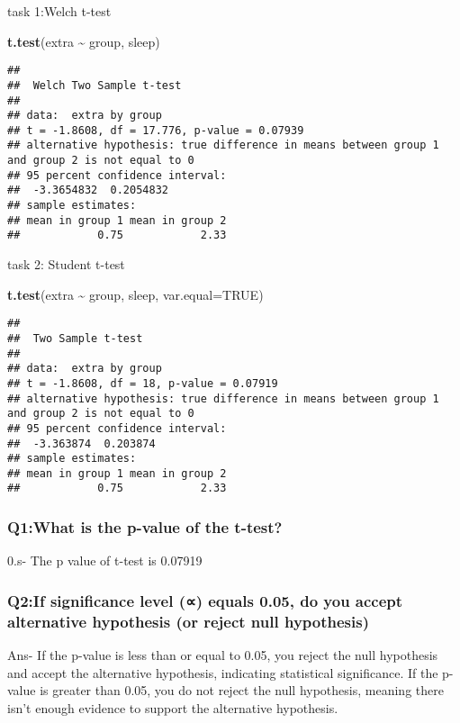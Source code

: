 \documentclass[
]{article}
\newenvironment{Shaded}{\begin{snugshade}}{\end{snugshade}}
\newcommand{\AttributeTok}[1]{\textcolor[rgb]{0.13,0.29,0.53}{#1}}
\newcommand{\ConstantTok}[1]{\textcolor[rgb]{0.56,0.35,0.01}{#1}}
\newcommand{\FunctionTok}[1]{\textcolor[rgb]{0.13,0.29,0.53}{\textbf{#1}}}
\newcommand{\NormalTok}[1]{#1}
\newcommand{\SpecialCharTok}[1]{\textcolor[rgb]{0.81,0.36,0.00}{\textbf{#1}}}
\begin{document}
task 1:Welch t-test

\begin{Shaded}
\begin{Highlighting}[]
\FunctionTok{t.test}\NormalTok{(extra }\SpecialCharTok{\textasciitilde{}}\NormalTok{ group, sleep)}
\end{Highlighting}
\end{Shaded}

\begin{verbatim}
## 
##  Welch Two Sample t-test
## 
## data:  extra by group
## t = -1.8608, df = 17.776, p-value = 0.07939
## alternative hypothesis: true difference in means between group 1 and group 2 is not equal to 0
## 95 percent confidence interval:
##  -3.3654832  0.2054832
## sample estimates:
## mean in group 1 mean in group 2 
##            0.75            2.33
\end{verbatim}

task 2: Student t-test

\begin{Shaded}
\begin{Highlighting}[]
\FunctionTok{t.test}\NormalTok{(extra }\SpecialCharTok{\textasciitilde{}}\NormalTok{ group, sleep, }\AttributeTok{var.equal=}\ConstantTok{TRUE}\NormalTok{)}
\end{Highlighting}
\end{Shaded}

\begin{verbatim}
## 
##  Two Sample t-test
## 
## data:  extra by group
## t = -1.8608, df = 18, p-value = 0.07919
## alternative hypothesis: true difference in means between group 1 and group 2 is not equal to 0
## 95 percent confidence interval:
##  -3.363874  0.203874
## sample estimates:
## mean in group 1 mean in group 2 
##            0.75            2.33
\end{verbatim}

\hypertarget{q1what-is-the-p-value-of-the-t-test}{%
\subsubsection{Q1:What is the p-value of the
t-test?}\label{q1what-is-the-p-value-of-the-t-test}}

0.s- The p value of t-test is 0.07919

\hypertarget{q2if-significance-level-equals-0.05-do-you-accept-alternative-hypothesis-or-reject-null-hypothesis}{%
\subsubsection{Q2:If significance level (∝) equals 0.05, do you accept
alternative hypothesis (or reject null
hypothesis)}\label{q2if-significance-level-equals-0.05-do-you-accept-alternative-hypothesis-or-reject-null-hypothesis}}

Ans- If the p-value is less than or equal to 0.05, you reject the null
hypothesis and accept the alternative hypothesis, indicating statistical
significance. If the p-value is greater than 0.05, you do not reject the
null hypothesis, meaning there isn't enough evidence to support the
alternative hypothesis.
\end{document}
